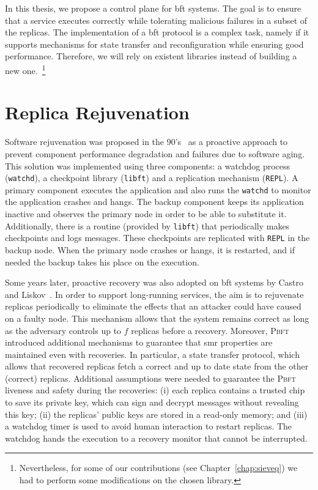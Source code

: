 In this thesis, we propose a control plane for \gls{bft} systems.
The goal is to ensure that a service executes correctly while tolerating malicious failures in a subset of the replicas.
The implementation of a \gls{bft} protocol is a complex task, namely if it supports mechanisms for state transfer and reconfiguration while ensuring good performance.
Therefore, we will rely on existent libraries instead of building a new one.~\footnote{Nevertheless, for some of our contributions (see Chapter~\ref{chap:sieveq}) we had to perform some modifications on the chosen library.}



\section{Replica Rejuvenation}
Software rejuvenation was proposed in the 90's~\cite{Huang:1993,Huang:1995} as a proactive approach to prevent component performance degradation and failures due to software aging. 
This solution was implemented using three components: a watchdog process (\texttt{watchd}), a checkpoint library (\texttt{libft}) and a replication mechanism (\texttt{REPL}). 
A primary component executes the application and also runs the \texttt{watchd} to monitor the application crashes and hangs. 
The backup component keeps its application inactive and observes the primary node in order to be able to substitute it. 
Additionally, there is a routine (provided by \texttt{libft}) that periodically makes checkpoints and logs messages. 
These checkpoints are replicated with \texttt{REPL} in the backup node. 
When the primary node crashes or hangs, it is restarted, and if needed the backup takes his place on the execution.


Some years later, proactive recovery was also adopted on \gls{bft} systems by Castro and Liskov~\cite{Castro:2002}.
In order to support long-running services, the aim is to rejuvenate replicas periodically to eliminate the effects that an attacker could have caused on a faulty node. 
This mechanism allows that the system remains correct as long as the adversary controls up to $f$ replicas before a recovery.
Moreover, \textsc{Pbft} introduced additional mechanisms to guarantee that \gls{smr} properties are maintained even with recoveries.
In particular, a state transfer protocol, which allows that recovered replicas fetch a correct and up to date state from the other (correct) replicas.
Additional assumptions were needed to guarantee the \textsc{Pbft} liveness and safety during the recoveries: 
(i) each replica contains a trusted chip to save its private key, which can sign and decrypt messages without revealing this key; 
(ii) the replicas' public keys are stored in a read-only memory; 
and (iii) a watchdog timer is used to avoid human interaction to restart replicas.
The watchdog hands the execution to a recovery monitor that cannot be interrupted.

